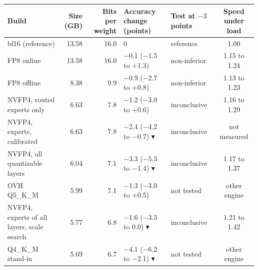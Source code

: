 \begin{tabular}{@{}lrrllc@{}}
\toprule
Build & Size (GB) & Bits per weight & Accuracy change (points) & Test at $-3$ points & Speed under load \\
\midrule
bf16 (reference) & 13.58 & 16.0 & 0 & reference & 1.00 \\
FP8 online & 13.58 & 16.0 & $-$0.1 ($-$1.5 to +1.3) & non-inferior & 1.15 to 1.24 \\
FP8 offline & 8.38 & 9.9 & $-$0.9 ($-$2.7 to +0.8) & non-inferior & 1.13 to 1.23 \\
NVFP4, routed experts only & 6.63 & 7.8 & $-$1.2 ($-$3.0 to +0.6) & inconclusive & 1.16 to 1.29 \\
NVFP4, experts, calibrated & 6.63 & 7.8 & \cellcolor[HTML]{F6D3C9}$-$2.4 ($-$4.2 to $-$0.7) \textcolor[HTML]{B4452A}{$\blacktriangledown$} & inconclusive & not measured \\
NVFP4, all quantizable layers & 6.04 & 7.1 & \cellcolor[HTML]{F6D3C9}$-$3.3 ($-$5.3 to $-$1.4) \textcolor[HTML]{B4452A}{$\blacktriangledown$} & inconclusive & 1.17 to 1.37 \\
OVH Q5\_K\_M & 5.99 & 7.1 & $-$1.3 ($-$3.0 to +0.5) & not tested & other engine \\
NVFP4, experts of all layers, scale search & 5.77 & 6.8 & \cellcolor[HTML]{F6D3C9}$-$1.6 ($-$3.3 to 0.0) \textcolor[HTML]{B4452A}{$\blacktriangledown$} & inconclusive & 1.21 to 1.42 \\
Q4\_K\_M stand-in & 5.69 & 6.7 & \cellcolor[HTML]{F6D3C9}$-$4.1 ($-$6.2 to $-$2.1) \textcolor[HTML]{B4452A}{$\blacktriangledown$} & not tested & other engine \\
\bottomrule
\end{tabular}
